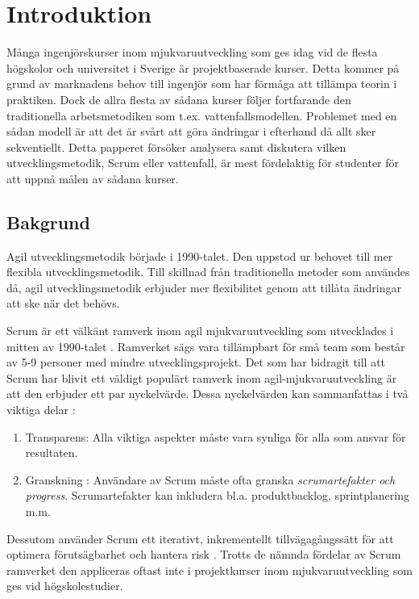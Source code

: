 \section{Introduktion}
\label{sec:Lieth_Wahid-introduction}
Många ingenjörskurser inom mjukvaruutveckling som ges idag vid de flesta högskolor och universitet i Sverige är projektbaserade
 kurser. Detta kommer på grund av marknadens behov till ingenjör som har förmåga att tillämpa teorin i praktiken. Dock de allra flesta av sådana 
 kurser följer fortfarande den traditionella arbetsmetodiken som t.ex. vattenfallsmodellen. Problemet med en sådan modell är att 
 det är svårt att göra ändringar i efterhand då allt sker sekventiellt. Detta papperet försöker analysera samt diskutera vilken utvecklingsmetodik, Scrum eller vattenfall, är mest fördelaktig för studenter för att uppnå målen av sådana kurser.
 
\subsection{Bakgrund}
Agil utvecklingsmetodik började i 1990-talet. Den uppstod ur behovet till mer flexibla utvecklingsmetodik. Till skillnad 
från traditionella metoder som användes då, agil utvecklingsmetodik erbjuder mer flexibilitet genom att tillåta ändringar att ske när 
det behövs.

Scrum är ett välkänt ramverk inom agil mjukvaruutveckling som utvecklades i mitten av 1990-talet \cite{TheScrum6:online}. 
Ramverket sägs vara tillämpbart för små team som består av 5-9 personer med mindre utvecklingsprojekt. Det som har bidragit
till att Scrum har blivit ett väldigt populärt ramverk inom agil-mjukvaruutveckling är att den erbjuder ett par nyckelvärde. Dessa 
nyckelvärden kan sammanfattas i två viktiga delar \cite{TheScrum6:online} : 
\begin{enumerate}\label{two}
	\item Transparens: Alla viktiga aspekter måste vara synliga för alla som ansvar för resultaten\cite{TheScrum6:online,}.
	\item Granskning : Användare av Scrum måste ofta granska \textit{scrumartefakter och progress}. Scrumartefakter kan inkludera
	 bl.a. produktbacklog, sprintplanering m.m\cite{TheScrum6:online,}.
\end{enumerate} 
Dessutom använder Scrum ett iterativt, inkrementellt tillvägagångssätt för att optimera förutsägbarhet och hantera risk \cite{TheScrum6:online,}. Trotts
de nämnda fördelar av Scrum ramverket den appliceras oftast inte i projektkurser inom mjukvaruutveckling som ges vid högskolestudier. 

